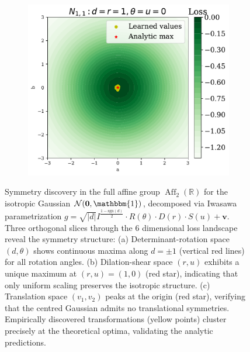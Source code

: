 \begin{figure}
\begin{subfigure}[b]{0.31\textwidth}
        \caption{}
        \label{fig:AGL2symm_ii}
    \end{subfigure}
    \hfill
    \begin{subfigure}[b]{0.31\textwidth}
        \centering
        \includegraphics[width=\textwidth]{figures/chapter-09/6GL2symmAB.pdf}
        \caption{}
        \label{fig:AGL2symm_iii}
    \end{subfigure}
    \caption[Orthogonal slices of $\operatorname{Aff}_2(\mathbb{R})$ symmetries for isotropic Gaussian.]{Symmetry discovery in the full affine group $\operatorname{Aff}_2(\mathbb{R})$ for the isotropic Gaussian $\mathcal{N}(\mathbf{0}, \mathbbm{1})$, decomposed via Iwasawa parametrization $g = \sqrt{|d|} I^{\frac{1-\text{sgn}(d)}{2}} \cdot R(\theta) \cdot D(r) \cdot S(u) + \mathbf{v}$. Three orthogonal slices through the 6 dimensional loss landscape reveal the symmetry structure: (a) Determinant-rotation space $(d, \theta)$ shows continuous maxima along $d = \pm 1$ (vertical red lines) for all rotation angles. (b) Dilation-shear space $(r, u)$ exhibits a unique maximum at $(r, u) = (1, 0)$ (red star), indicating that only uniform scaling preserves the isotropic structure. (c) Translation space $(v_1, v_2)$ peaks at the origin (red star), verifying that the centred Gaussian admits no translational symmetries. Empirically discovered transformations (yellow points) cluster precisely at the theoretical optima, validating the analytic predictions.}
    \label{fig:AGL2symm}
\end{figure}
